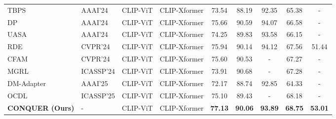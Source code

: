 \begin{table}[t]
\begin{center}
{\begin{tabular}{l|lcc|ccccc}
TBPS~\cite{cao2024empirical}&AAAI'24&CLIP-ViT& CLIP-Xformer&73.54& 88.19 &92.35& 65.38&-\\
DP~\cite{song2024diverse} & AAAI'24 & CLIP-ViT & CLIP-Xformer & 75.66 & 90.59 & 94.07 & 66.58 & - \\

UASA~\cite{zhao2024unifying} & AAAI'24 & CLIP-ViT & CLIP-Xformer & 74.25 & 89.83 &  93.58 & 66.15 & - \\

{RDE}~\cite{qin2024noisy} & CVPR'24 & CLIP-ViT& CLIP-Xformer & {75.94} &{90.14}& {94.12} &{67.56}& {51.44} \\  

CFAM ~\cite{zuo2024ufinebench}&CVPR'24&CLIP-ViT& CLIP-Xformer&75.60& 90.53&-&67.27&-\\
MGRL ~\cite{lv2024mgrl}&ICASSP'24&CLIP-ViT& CLIP-Xformer&73.91& 90.68&-& 67.28&-\\
DM-Adapter~\cite{liu2025dm} & AAAI'25 & CLIP-ViT & CLIP-Xformer & 72.17 & 88.74 & 92.85 &64.33 & - \\

OCDL ~\cite{li2025object}&ICASSP'25&CLIP-ViT& CLIP-Xformer&75.10& 89.43&-& 68.18&-\\
\midrule


\textbf{CONQUER (Ours) }& -& CLIP-ViT& CLIP-Xformer & \textbf{77.13} & \textbf{90.06}&\textbf {93.89} &\textbf{68.75}& \textbf{ 53.01 } \\  
\bottomrule[1pt]
\end{tabular}}

\end{center}
\end{table}

